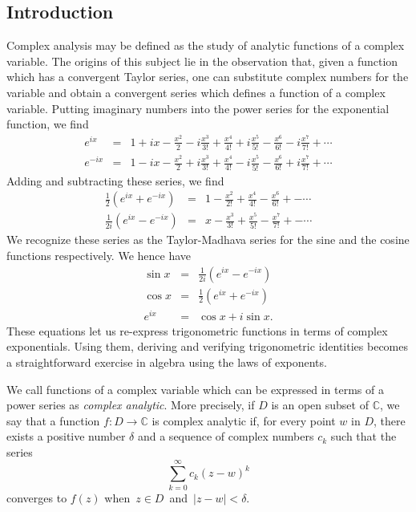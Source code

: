 \documentclass[12pt]{article}
\theoremstyle{definition}
\begin{document}
\subsection*{Introduction}
Complex analysis may be defined as the study of analytic 
functions of a complex variable.  The origins of this subject
lie in the observation that, given a function which has a
convergent Taylor series, one can substitute complex numbers
for the variable and obtain a convergent series which defines
a function of a complex variable.  Putting
imaginary numbers into the power series for the exponential
function, we find
\begin{eqnarray*}
e^{ix} &=& 1 + i x - \frac{x^2}{2} - i \frac{x^3}{3!} + 
\frac{x^4}{4!} + i \frac{x^5}{5!} - \frac{x^6}{6!} - i 
\frac{x^7}{7!}+\cdots \\
e^{-ix} &=& 1 - i x - \frac{x^2}{2} + i \frac{x^3}{3!} + 
\frac{x^4}{4!} - i \frac{x^5}{5!} - \frac{x^6}{6!} + i 
\frac{x^7}{7!}+\cdots 
\end{eqnarray*}
Adding and subtracting these series, we find
\begin{eqnarray*}
\frac{1}{2} (e^{ix} + e^{-ix}) &=& 1 - \frac{x^2}{2!} + 
\frac{x^4}{4!} - \frac{x^6}{6!} +- \cdots \\
\frac{1}{2i} (e^{ix} - e^{-ix}) &=& x - \frac{x^3}{3!} + 
\frac{x^5}{5!} - \frac{x^7}{7!} +- \cdots
\end{eqnarray*}
We recognize these series as the Taylor-Madhava series for 
the sine and the cosine functions respectively.  We hence have
\begin{eqnarray*}
\sin x &=& \frac{1}{2i} (e^{ix} - e^{-ix}) \\
\cos x &=& \frac{1}{2} (e^{ix} + e^{-ix}) \\
e^{ix} &=& \cos x + i \sin x .
\end{eqnarray*}
These equations let us re-express trigonometric functions
in terms of complex exponentials.  Using them, deriving and
verifying trigonometric identities becomes a straightforward
exercise in algebra using the laws of exponents.

We call functions of a complex variable which can be
expressed in terms of a power series as \emph{complex
analytic}.  More precisely, if $D$ is an open 
subset of $\mathbb{C}$, we say that a function $f
\colon D \to \mathbb{C}$ is complex analytic
if, for every point $w$ in $D$, there exists a positive
number $\delta$ and a sequence of complex numbers
$c_k$ such that the series
\[
\sum_{k=0}^\infty c_k (z-w)^k
\]
converges to $f(z)$ when\, $z \in D$\, and\, 
$|z - w| < \delta$.
\end{document}

